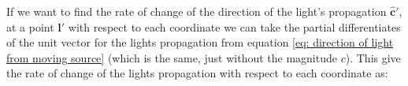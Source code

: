 If we want to find the rate of change of the direction of the light's propagation $\mathbf{\hat{c}}'$, at a point $\mathbf{l'}$ with respect to each coordinate we can take the partial differentiates of the unit vector for the lights propagation from equation \eqref{eq: direction of light from moving source} (which is the same, just without the magnitude $c$).
This give the rate of change of the lights propagation with respect to each coordinate as:

%
